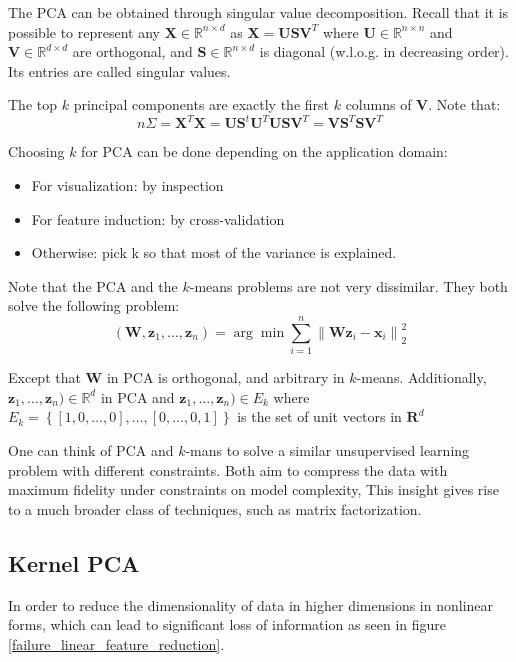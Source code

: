 \documentclass[a4paper,10pt,twoside]{article}
\newcommand\norm[1]{\left\lVert#1\right\rVert}
\begin{document}
The PCA can be obtained through singular value decomposition. Recall that it is possible to represent any $\mathbf{X}\in\mathbb{R}^{n\times d}$ as $\mathbf{X=USV}^T$ where $\mathbf{U}\in\mathbb{R}^{n\times n}$ and $\mathbf{V}\in\mathbb{R}^{d\times d}$ are orthogonal, and $\mathbf{S}\in\mathbb{R}^{n\times d}$ is diagonal (w.l.o.g. in decreasing order). Its entries are called singular values.

The top $k$ principal components are exactly the first $k$ columns of $\mathbf{V}$. Note that:
\begin{equation}
    n\Sigma=\mathbf{X}^T\mathbf{X}=\mathbf{US}^t\mathbf{U}^T\mathbf{USV}^T=\mathbf{VS}^T\mathbf{SV}^T
\end{equation}

Choosing $k$ for PCA can be done depending on the application domain:
\begin{itemize}
    \item For visualization: by inspection
    \item For feature induction: by cross-validation
    \item Otherwise: pick k so that most of the variance is explained.
\end{itemize}

Note that the PCA and the $k$-means problems are not very dissimilar. They both solve the following problem:
\begin{equation*}
    (\mathbf{W}, \mathbf{z}_1, \ldots, \mathbf{z}_n)=\arg\min\sum_{i=1}^{n}\norm{\mathbf{W}\mathbf{z}_i-\mathbf{x}_i}^2_2
\end{equation*}

Except that $\mathbf{W}$ in PCA is orthogonal, and arbitrary in $k$-means.
Additionally, $\mathbf{z}_1, \ldots, \mathbf{z}_n)\in\mathbb{R}^{d}$ in PCA and $\mathbf{z}_1, \ldots, \mathbf{z}_n)\in E_k$ where $E_k=\left\{[1,0,\ldots, 0],\ldots, [0,\ldots, 0, 1]\right\}$ is the set of unit vectors in $\mathbf{R}^d$

One can think of PCA and $k$-mans to solve a similar unsupervised learning problem with different constraints. Both aim to compress the data with maximum fidelity under constraints on model complexity, This insight gives rise to a much broader class of techniques, such as matrix factorization.

\subsection{Kernel PCA}

In order to reduce the dimensionality of data in higher dimensions in nonlinear forms, which can lead to significant loss of information as seen in figure \ref{failure_linear_feature_reduction}.
\end{document}
